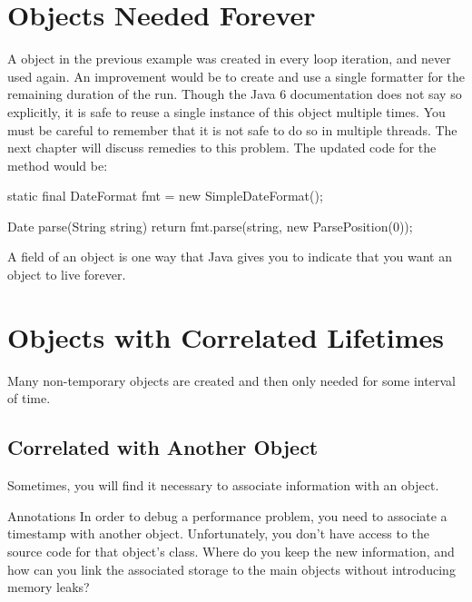 



\section{Objects Needed Forever}
\label{forever-lifetime}

A  object in the previous example was created in every
loop iteration, and never used again. An improvement would be to create and
use a single formatter for the remaining duration of the run. Though the Java 6
documentation does not say so explicitly, it is safe to reuse a single instance
of this object multiple times. You must be careful to remember that it is
not safe to do so in multiple threads. The next chapter will discuss remedies
to this problem. The updated code for the  method would be:

\begin{shortlisting}
static final DateFormat fmt = new SimpleDateFormat();

Date parse(String string) {
	return fmt.parse(string, new ParsePosition(0));
}
\end{shortlisting} 

A  field of an object is one way that Java gives you to indicate
that you want an object to live forever.

\section{Objects with Correlated Lifetimes}

Many non-temporary objects are created and then only needed for some interval of
time.

\subsection{Correlated with Another Object}
\label{correlated-lifetime-1}

Sometimes, you will find it necessary to associate information with
an object. 

\begin{example}{Annotations}
In order to debug a performance problem, you need to associate a timestamp with
another object. Unfortunately, you don't have access to the source code for
that object's class. Where do you keep the new information, and how can you
link the associated storage to the main objects without introducing memory leaks?
\end{example}


